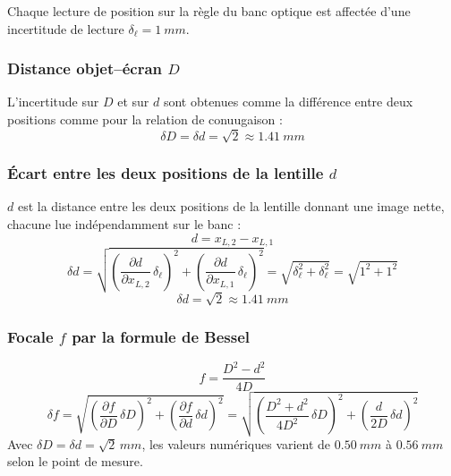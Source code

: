 ﻿\documentclass[a4paper, 11pt]{article}
\begin{document}
Chaque lecture de position sur la règle du banc optique est affectée d'une
incertitude de lecture $\delta_\ell = \SI{1}{mm}$.

\subsubsection{Distance objet--écran \texorpdfstring{$D$}{D}}

L'incertitude sur $D$ et sur $d$ sont obtenues comme la différence entre deux positions comme pour la relation de conuugaison :
\begin{equation}
  \boxed{\delta D = \delta d = \sqrt{2} \approx \SI{1.41}{mm}}
\end{equation}

\subsubsection{Écart entre les deux positions de la lentille \texorpdfstring{$d$}{d}}

$d$ est la distance entre les deux positions de la lentille donnant une image
nette, chacune lue indépendamment sur le banc :
\begin{equation}
  d = x_{L,2} - x_{L,1}
\end{equation}
\begin{equation}
  \delta d
  = \sqrt{
      \left(\frac{\partial d}{\partial x_{L,2}}\,\delta_\ell\right)^2
    + \left(\frac{\partial d}{\partial x_{L,1}}\,\delta_\ell\right)^2}
  = \sqrt{\delta_\ell^2 + \delta_\ell^2}
  = \sqrt{1^2 + 1^2}
\end{equation}
\begin{equation}
  \boxed{\delta d = \sqrt{2} \approx \SI{1.41}{mm}}
\end{equation}

\subsubsection{Focale \texorpdfstring{$f$}{f} par la formule de Bessel}

\begin{equation}
  f = \frac{D^2 - d^2}{4D}
\end{equation}
\begin{equation}
  \delta f = \sqrt{
    \left(\frac{\partial f}{\partial D}\,\delta D\right)^{\!2}
    +
    \left(\frac{\partial f}{\partial d}\,\delta d\right)^{\!2}}
  = \sqrt{
    \left(\frac{D^2+d^2}{4D^2}\,\delta D\right)^{\!2}
    +
    \left(\frac{d}{2D}\,\delta d\right)^{\!2}}
\end{equation}
Avec $\delta D = \delta d = \sqrt{2}\,\si{mm}$, les valeurs numériques varient
de $\SI{0.50}{mm}$ à $\SI{0.56}{mm}$ selon le point de mesure.
\end{document}
